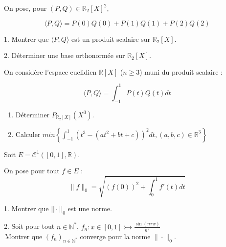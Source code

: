 \noindent On pose, pour $(P,Q) \in \mathbb{R}_2[X]^2,$

\vspace{-15pt}
\begin{equation*}
    \langle {P, Q} \rangle = P(0)Q(0) + P(1)Q(1) + P(2)Q(2)
\end{equation*}
\vspace{-15pt}

1. Montrer que $\langle {P, Q} \rangle$ est un produit scalaire sur $\mathbb{R}_2[X]$.

\vspace{1pt}
2. Déterminer une base orthonormée sur $\mathbb{R}_2[X]$.



\subetoiles



\noindent On considère l'espace euclidien $\mathbb{R}[X]$ ($n \geqslant 3$) muni du produit scalaire :

\vspace{-15pt}
\begin{equation*}
    \langle {P, Q} \rangle = \int_{-1}^{1}P(t)Q(t)dt
\end{equation*}
\begin{enumerate}
    \vspace*{-10pt}
    \item Déterminer $\displaystyle P_{\mathbb{R}_2[X]}(X^3)$.
    \vspace*{-5pt}
    \item Calculer $\displaystyle min\left\{\int_{-1}^{1}{(t^3 - (at^2 + bt + c))^2dt, (a,b,c) \in \mathbb{R}^3}\right\}$
\end{enumerate}



\subetoiles



\noindent Soit $E = \mathcal{C}^1([0,1], \mathbb{R})$.

\noindent On pose pour tout $f \in E$ :
\begin{equation*}
    \|f\|_0 = \sqrt{(f(0))^2 + \int_{0}^{1} f'(t)dt}
\end{equation*}

1. Montrer que $||\cdot||_0$ est une norme.

2. Soit pour tout $n \in \mathbb{N}^*$, $\displaystyle f_n : x \in [0,1] \rightarrowtail \frac {\sin(n\pi x)} {n^2}$ \\
\indent \quad \,Montrer que $(f_n)_{n \in \mathbb{N}^*}$ converge pour la norme $\|\cdot\|_0$.